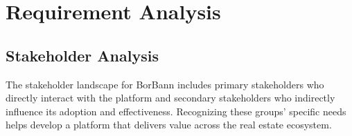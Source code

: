 \chapter{Requirement Analysis}



\section{Stakeholder Analysis}

The stakeholder landscape for BorBann includes primary stakeholders who directly interact with the platform and secondary stakeholders who indirectly influence its adoption and effectiveness. Recognizing these groups' specific needs helps develop a platform that delivers value across the real estate ecosystem.


